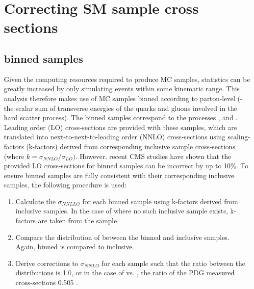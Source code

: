 \section{Correcting SM sample cross sections}
\label{sec:mc_xsec_corrs}

\subsection{\HTpart binned samples}
Given the computing resources required to produce MC samples, statistics
can be greatly increased by only simulating events within some kinematic range.
This analysis therefore makes use of MC samples binned
according to parton-level \HT (\HTpart - the scalar sum of transverse energies of 
the quarks and gluons involved in the hard scatter process). The binned samples
correspond to the processes \wj, \zj and \dyj.
Leading order (LO) cross-sections are provided with 
these samples, which are translated into next-to-next-to-leading order (NNLO) 
cross-sections using scaling-factors (k-factors) derived from corresponding 
inclusive sample cross-sections (where $k = \sigma_{NNLO}/\sigma_{LO})$. However,
recent CMS studies \cite{RobXS} have shown that the
provided LO cross-sections for \HTpart binned samples can 
be incorrect by up to 10\%. To ensure \HTpart binned samples are fully consistent
with their corresponding inclusive samples, the following procedure is used:

\begin{enumerate}
\item Calculate the $\sigma_{NNLLO}$ for each \HTpart binned sample using k-factors derived from inclusive samples.
In the case of \zj where no such inclusive sample exists, k-factors are taken from the \dyj sample.
\item Compare the distribution of \HTpart between the binned and inclusive samples. Again, \zj binned is compared to \dyj inclusive.
\item Derive corrections to $\sigma_{NNLO}$ for each \HTpart sample such that the ratio between the \HTpart distributions
is 1.0, or in the case of \zj vs. \dyj, the ratio of the PDG measured cross-sections 0.505 \cite{Agashe:2014kda}.
\end{enumerate}

